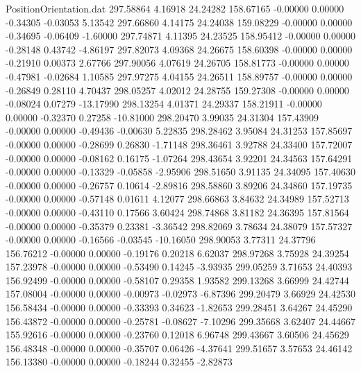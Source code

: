 \begin{filecontents}{PositionOrientation.dat}
 297.58864    4.16918   24.24282   158.67165   -0.00000    0.00000   -0.34305   -0.03053    5.13542
 297.66860    4.14175   24.24038   159.08229   -0.00000    0.00000   -0.34695   -0.06409   -1.60000
 297.74871    4.11395   24.23525   158.95412   -0.00000    0.00000   -0.28148    0.43742   -4.86197
 297.82073    4.09368   24.26675   158.60398   -0.00000    0.00000   -0.21910    0.00373    2.67766
 297.90056    4.07619   24.26705   158.81773   -0.00000    0.00000   -0.47981   -0.02684    1.10585
 297.97275    4.04155   24.26511   158.89757   -0.00000    0.00000   -0.26849    0.28110    4.70437
 298.05257    4.02012   24.28755   159.27308   -0.00000    0.00000   -0.08024    0.07279  -13.17990
 298.13254    4.01371   24.29337   158.21911   -0.00000    0.00000   -0.32370    0.27258  -10.81000
 298.20470    3.99035   24.31304   157.43909   -0.00000    0.00000   -0.49436   -0.00630    5.22835
 298.28462    3.95084   24.31253   157.85697   -0.00000    0.00000   -0.28699    0.26830   -1.71148
 298.36461    3.92788   24.33400   157.72007   -0.00000    0.00000   -0.08162    0.16175   -1.07264
 298.43654    3.92201   24.34563   157.64291   -0.00000    0.00000   -0.13329   -0.05858   -2.95906
 298.51650    3.91135   24.34095   157.40630   -0.00000    0.00000   -0.26757    0.10614   -2.89816
 298.58860    3.89206   24.34860   157.19735   -0.00000    0.00000   -0.57148    0.01611    4.12077
 298.66863    3.84632   24.34989   157.52713   -0.00000    0.00000   -0.43110    0.17566    3.60424
 298.74868    3.81182   24.36395   157.81564   -0.00000    0.00000   -0.35379    0.23381   -3.36542
 298.82069    3.78634   24.38079   157.57327   -0.00000    0.00000   -0.16566   -0.03545  -10.16050
 298.90053    3.77311   24.37796   156.76212   -0.00000    0.00000   -0.19176    0.20218    6.62037
 298.97268    3.75928   24.39254   157.23978   -0.00000    0.00000   -0.53490    0.14245   -3.93935
 299.05259    3.71653   24.40393   156.92499   -0.00000    0.00000   -0.58107    0.29358    1.93582
 299.13268    3.66999   24.42744   157.08004   -0.00000    0.00000   -0.00973   -0.02973   -6.87396
 299.20479    3.66929   24.42530   156.58434   -0.00000    0.00000   -0.33393    0.34623   -1.82653
 299.28451    3.64267   24.45290   156.43872   -0.00000    0.00000   -0.25781   -0.08627   -7.10296
 299.35668    3.62407   24.44667   155.92616   -0.00000    0.00000   -0.23760    0.12018    6.96748
 299.43667    3.60506   24.45629   156.48348   -0.00000    0.00000   -0.35707    0.06426   -4.37641
 299.51657    3.57653   24.46142   156.13380   -0.00000    0.00000   -0.18244    0.32455   -2.82873

\end{filecontents}
